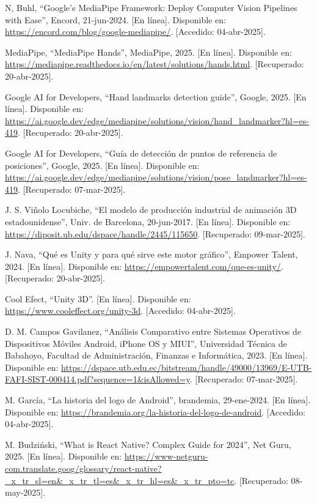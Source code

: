 \begin{thebibliography}{200}
    N, Buhl, “Google’s MediaPipe Framework: Deploy Computer Vision Pipelines with Ease”, Encord, 21-jun-2024. [En línea]. Disponible en: \url{https://encord.com/blog/google-mediapipe/}. [Accedido: 04-abr-2025].

    MediaPipe, “MediaPipe Hands”, MediaPipe, 2025. [En línea]. Disponible en: \url{https://mediapipe.readthedocs.io/en/latest/solutions/hands.html}. [Recuperado: 20-abr-2025].

    Google AI for Developers, “Hand landmarks detection guide”, Google, 2025. [En línea]. Disponible en: \url{https://ai.google.dev/edge/mediapipe/solutions/vision/hand_landmarker?hl=es-419}. [Recuperado: 20-abr-2025].

    Google AI for Developers, “Guía de detección de puntos de referencia de posiciones”, Google, 2025. [En línea]. Disponible en: \url{https://ai.google.dev/edge/mediapipe/solutions/vision/pose_landmarker?hl=es-419}. [Recuperado: 07-mar-2025].

    J. S. Viñolo Locubiche, “El modelo de producción industrial de animación 3D estadounidense”, Univ. de Barcelona, 20-jun-2017. [En línea]. Disponible en: \url{https://diposit.ub.edu/dspace/handle/2445/115650}. [Recuperado: 09-mar-2025].

    J. Nava, “Qué es Unity y para qué sirve este motor gráfico”, Empower Talent, 2024. [En línea]. Disponible en: \url{https://empowertalent.com/que-es-unity/}. [Recuperado: 20-abr-2025].

    Cool Efect, “Unity 3D”. [En línea]. Disponible en: \url{https://www.cooleffect.org/unity-3d}. [Accedido: 04-abr-2025].

    D. M. Campos Gavilanez, “Análisis Comparativo entre Sistemas Operativos de Dispositivos Móviles Android, iPhone OS y MIUI”, Universidad Técnica de Babahoyo, Facultad de Administración, Finanzas e Informática, 2023. [En línea]. Disponible en: \url{https://dspace.utb.edu.ec/bitstream/handle/49000/13969/E-UTB-FAFI-SIST-000414.pdf?sequence=1&isAllowed=y}. [Recuperado: 07-mar-2025].

    M. García, “La historia del logo de Android”, brandemia, 29-ene-2024. [En línea]. Disponible en: \url{https://brandemia.org/la-historia-del-logo-de-android}. [Accedido: 04-abr-2025].

    M. Budziński, “What is React Native? Complex Guide for 2024”, Net Guru, 2025. [En línea]. Disponible en: \url{https://www-netguru-com.translate.goog/glossary/react-native?_x_tr_sl=en&_x_tr_tl=es&_x_tr_hl=es&_x_tr_pto=tc}. [Recuperado: 08-may-2025].


\end{thebibliography}
